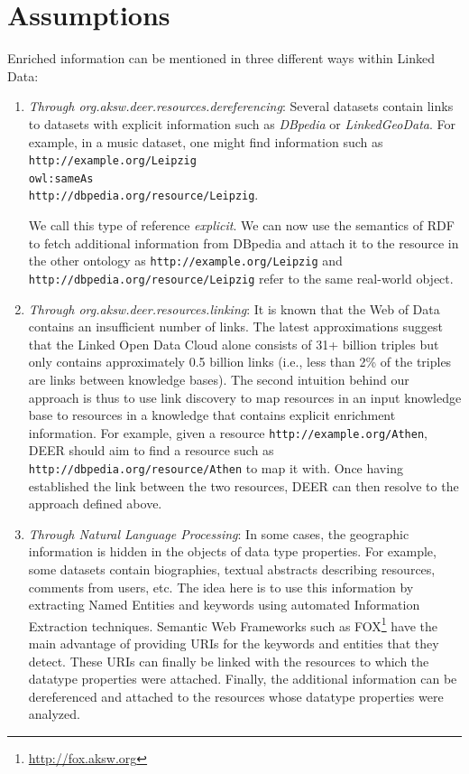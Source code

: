 \documentclass[a4paper,twoside,bibtotoc,abstracton,12pt,BCOR=15mm]{article}
\newcommand{\geolift}{\textsc{DEER}\xspace}
\begin{document}
\section{Assumptions}
 Enriched information can be mentioned in three different ways within Linked Data:
\begin{enumerate}
\item \emph{Through org.aksw.deer.resources.dereferencing}: Several datasets contain links to datasets with explicit information such as \emph{DBpedia} or \emph{LinkedGeoData}.
For example, in a music dataset, one might find information such as\\ 
\texttt{http://example.org/Leipzig \\
owl:sameAs \\ 
http://dbpedia.org/resource/Leipzig}.

We call this type of reference \emph{explicit}. 
We can now use the semantics of RDF to fetch additional information from DBpedia and attach it to the resource in the other ontology as \texttt{http://example.org/Leipzig} and \texttt{http://dbpedia.org/resource/Leipzig} refer to the same real-world object.

\item \emph{Through org.aksw.deer.resources.linking}: It is known that the Web of Data contains an insufficient number of links.
The latest approximations suggest that the Linked Open Data Cloud alone consists of 31+ billion triples but only contains approximately 0.5 billion links (i.e., less than 2\% of the triples are links between knowledge bases). 
The second intuition behind our approach is thus to use link discovery to map resources in an input knowledge base to resources in a knowledge that contains explicit enrichment information. 
For example, given a resource \texttt{http://example.org/Athen}, \geolift should aim to find a resource such as \texttt{http://dbpedia.org/resource/Athen} to map it with. 
Once having established the link between the two resources, \geolift can then resolve to the approach defined above.

\item \emph{Through Natural Language Processing}: In some cases, the geographic information is hidden in the objects of data type properties. 
For example, some datasets contain biographies, textual abstracts describing resources, comments from users, etc.
The idea here is to use this information by extracting Named Entities and keywords using automated Information Extraction techniques.
Semantic Web Frameworks such as FOX\footnote{\url{http://fox.aksw.org}} have the main advantage of providing URIs for the keywords and entities that they detect.
These URIs can finally be linked with the resources to which the datatype properties were attached.
Finally, the additional information can be dereferenced and attached to the resources whose datatype properties were analyzed.
\end{enumerate}
\end{document}
